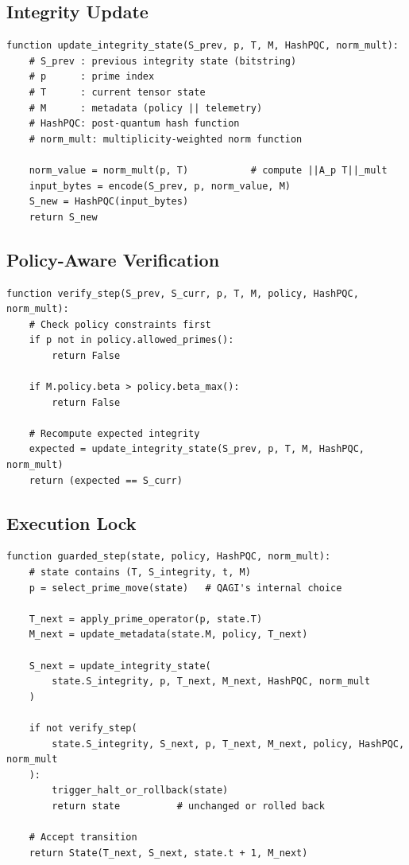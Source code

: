 \documentclass[11pt]{article}
\begin{document}
\subsection{Integrity Update}

\begin{verbatim}
function update_integrity_state(S_prev, p, T, M, HashPQC, norm_mult):
    # S_prev : previous integrity state (bitstring)
    # p      : prime index
    # T      : current tensor state
    # M      : metadata (policy || telemetry)
    # HashPQC: post-quantum hash function
    # norm_mult: multiplicity-weighted norm function

    norm_value = norm_mult(p, T)           # compute ||A_p T||_mult
    input_bytes = encode(S_prev, p, norm_value, M)
    S_new = HashPQC(input_bytes)
    return S_new
\end{verbatim}

\subsection{Policy-Aware Verification}

\begin{verbatim}
function verify_step(S_prev, S_curr, p, T, M, policy, HashPQC, norm_mult):
    # Check policy constraints first
    if p not in policy.allowed_primes():
        return False

    if M.policy.beta > policy.beta_max():
        return False

    # Recompute expected integrity
    expected = update_integrity_state(S_prev, p, T, M, HashPQC, norm_mult)
    return (expected == S_curr)
\end{verbatim}

\subsection{Execution Lock}

\begin{verbatim}
function guarded_step(state, policy, HashPQC, norm_mult):
    # state contains (T, S_integrity, t, M)
    p = select_prime_move(state)   # QAGI's internal choice

    T_next = apply_prime_operator(p, state.T)
    M_next = update_metadata(state.M, policy, T_next)

    S_next = update_integrity_state(
        state.S_integrity, p, T_next, M_next, HashPQC, norm_mult
    )

    if not verify_step(
        state.S_integrity, S_next, p, T_next, M_next, policy, HashPQC, norm_mult
    ):
        trigger_halt_or_rollback(state)
        return state          # unchanged or rolled back

    # Accept transition
    return State(T_next, S_next, state.t + 1, M_next)
\end{verbatim}
\end{document}
